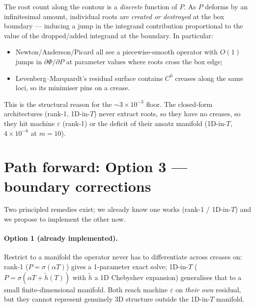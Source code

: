 \documentclass[11pt]{article}
\begin{document}
The root count along the contour is a \emph{discrete} function of $P$. As $P$
deforms by an infinitesimal amount, individual roots are \emph{created or
destroyed} at the box boundary --- inducing a jump in the integrand
contribution proportional to the value of the dropped/added integrand at the
boundary. In particular:
\begin{itemize}
  \item Newton/Anderson/Picard all see a piecewise-smooth operator with $O(1)$
        jumps in $\partial \Phi / \partial P$ at parameter values where roots
        cross the box edge;
  \item Levenberg--Marquardt's residual surface contains $C^0$ creases along
        the same loci, so its minimiser pins on a crease.
\end{itemize}

This is the structural reason for the $\sim 3\!\times\!10^{-3}$ floor. The
closed-form architectures (rank-1, 1D-in-$T$) never extract roots, so they
have no creases, so they hit machine $\varepsilon$ (rank-1) or the deficit of
their ansatz manifold (1D-in-$T$, $4\!\times\!10^{-6}$ at $m{=}10$).

\section{Path forward: Option 3 --- boundary corrections}

Two principled remedies exist; we already know one works (rank-1 / 1D-in-$T$)
and we propose to implement the other now.

\paragraph{Option 1 (already implemented).}
Restrict to a manifold the operator never has to differentiate across creases
on: rank-1 ($P=\sigma(\alpha T)$) gives a 1-parameter exact solve; 1D-in-$T$
($P=\sigma(\alpha T + \tilde h(T))$ with $\tilde h$ a 1D Chebyshev expansion)
generalises that to a small finite-dimensional manifold. Both reach machine
$\varepsilon$ on \emph{their own} residual, but they cannot represent
genuinely 3D structure outside the 1D-in-$T$ manifold.
\end{document}
